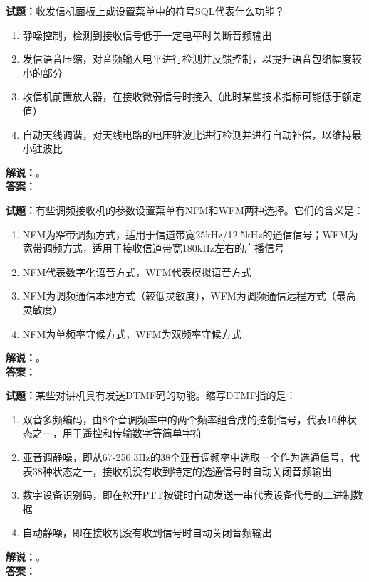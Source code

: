 \documentclass{ctexbook}
\begin{document}
\vspace{\baselineskip}

\noindent\textbf{试题：}收发信机面板上或设置菜单中的符号SQL代表什么功能？
\begin{enumerate}[leftmargin=3em]
  \item 静噪控制，检测到接收信号低于一定电平时关断音频输出
  \item 发信语音压缩，对音频输入电平进行检测并反馈控制，以提升语音包络幅度较小的部分
  \item 收信机前置放大器，在接收微弱信号时接入（此时某些技术指标可能低于额定值）
  \item 自动天线调谐，对天线电路的电压驻波比进行检测并进行自动补偿，以维持最小驻波比
\end{enumerate}
\noindent\textbf{解说：}\textbf{}。\\\noindent\textbf{答案：}

\vspace{\baselineskip}

\noindent\textbf{试题：}有些调频接收机的参数设置菜单有NFM和WFM两种选择。它们的含义是：
\begin{enumerate}[leftmargin=3em]
  \item NFM为窄带调频方式，适用于信道带宽25\unit{\kHz}/12.5\unit{\kHz}的通信信号；WFM为宽带调频方式，适用于接收信道带宽180\unit{\kHz}左右的广播信号
  \item NFM代表数字化语音方式，WFM代表模拟语音方式
  \item NFM为调频通信本地方式（较低灵敏度），WFM为调频通信远程方式（最高灵敏度）
  \item NFM为单频率守候方式，WFM为双频率守候方式
\end{enumerate}
\noindent\textbf{解说：}\textbf{}。\\\noindent\textbf{答案：}

\vspace{\baselineskip}

\noindent\textbf{试题：}某些对讲机具有发送DTMF码的功能。缩写DTMF指的是：
\begin{enumerate}[leftmargin=3em]
  \item 双音多频编码，由8个音调频率中的两个频率组合成的控制信号，代表16种状态之一，用于遥控和传输数字等简单字符
  \item 亚音调静噪，即从67-250.3Hz的38个亚音调频率中选取一个作为选通信号，代表38种状态之一，接收机没有收到特定的选通信号时自动关闭音频输出
  \item 数字设备识别码，即在松开PTT按键时自动发送一串代表设备代号的二进制数据
  \item 自动静噪，即在接收机没有收到信号时自动关闭音频输出
\end{enumerate}
\noindent\textbf{解说：}\textbf{}。\\\noindent\textbf{答案：}
\end{document}
